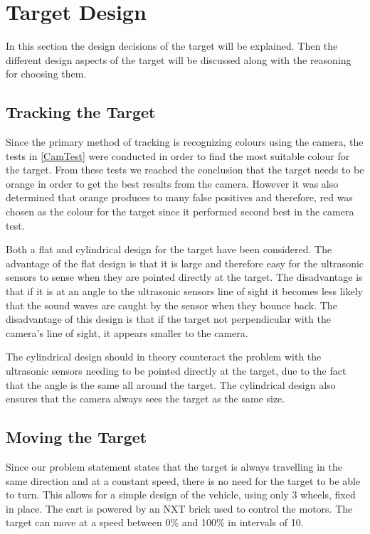 \section{Target Design}\label{targetDesign}
In this section the design decisions of the target will be explained. Then the
different design aspects of the target will be discussed along with the
reasoning for choosing them.

\subsection{Tracking the Target}
Since the primary method of tracking is recognizing colours using the camera,
the tests in \autoref{CamTest} were conducted in order to find the most suitable
colour for the target. From these tests we reached the conclusion that the
target needs to be orange in order to get the best results from the camera. However it
was also determined that orange produces to many false positives and therefore,
red was chosen as the colour for the target since it performed second best in
the camera test.
\nl

Both a flat and cylindrical design for the target have been considered. The
advantage of the flat design is that it is large and therefore easy for the ultrasonic
sensors to sense when they are pointed directly at the target. The disadvantage
is that if it is at an angle to the ultrasonic sensors line of sight it
becomes less likely that the sound waves are caught by the sensor when they
bounce back. The disadvantage of this design is that if the target not
perpendicular with the camera's line of sight, it appears smaller to
the camera.\nl

The cylindrical design should in theory counteract the problem with the
ultrasonic sensors needing to be pointed directly at the target, due to the
fact that the angle is the same all around the target. The cylindrical design
also ensures that the camera always sees the target as the same size.\nl

\subsection{Moving the Target}
Since our problem statement states that the target is always travelling in the
same direction and at a constant speed, there is no need for the target to be
able to turn. This allows for a simple design of the vehicle, using only 3
wheels, fixed in place. The cart is powered by an NXT brick used to control the
motors. The target can move at a speed between 0\% and 100\% in intervals of
10.
\nl


